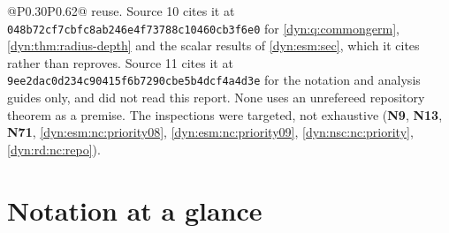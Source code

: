\documentclass[11pt,letterpaper]{article}
\theoremstyle{definition}
\theoremstyle{remark}
\numberwithin{equation}{section}
\begin{document}
\begin{longtable}{@{}P{0.30\textwidth}P{0.62\textwidth}@{}}
reuse. Source 10 cites it at
\texttt{048b72cf7cbfc8ab246e4f73788c10460cb3f6e0} for
\cref{dyn:q:commongerm}, \cref{dyn:thm:radius-depth} and the scalar results
of \cref{dyn:esm:sec}, which it cites rather than reproves. Source 11 cites
it at \texttt{9ee2dac0d234c90415f6b7290cbe5b4dcf4a4d3e} for the notation
and analysis guides only, and did not read this report. None uses an
unrefereed repository theorem as a premise. The
inspections were targeted, not exhaustive (\textbf{N9}, \textbf{N13},
\textbf{N71}, \ref{dyn:esm:nc:priority08},
\ref{dyn:esm:nc:priority09}, \ref{dyn:nsc:nc:priority},
\ref{dyn:rd:nc:repo}).\\
\bottomrule
\end{longtable}

\section{Notation at a glance}
\label{dyn:app:notation}
\end{document}
